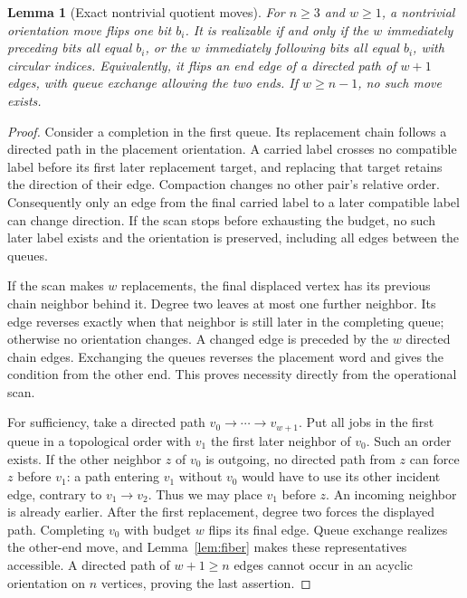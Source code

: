 \documentclass[11pt]{article}
\newtheorem{lemma}[theorem]{Lemma}
\theoremstyle{remark}
\begin{document}
\begin{lemma}[Exact nontrivial quotient moves]\label{lem:local}
For $n\ge3$ and $w\ge1$, a nontrivial orientation move flips one bit $b_i$. It is realizable if and only if the $w$ immediately preceding bits all equal $b_i$, or the $w$ immediately following bits all equal $b_i$, with circular indices. Equivalently, it flips an end edge of a directed path of $w+1$ edges, with queue exchange allowing the two ends. If $w\ge n-1$, no such move exists.
\end{lemma}
\begin{proof}
Consider a completion in the first queue. Its replacement chain follows a directed path in the placement orientation. A carried label crosses no compatible label before its first later replacement target, and replacing that target retains the direction of their edge. Compaction changes no other pair's relative order. Consequently only an edge from the final carried label to a later compatible label can change direction. If the scan stops before exhausting the budget, no such later label exists and the orientation is preserved, including all edges between the queues.

If the scan makes $w$ replacements, the final displaced vertex has its previous chain neighbor behind it. Degree two leaves at most one further neighbor. Its edge reverses exactly when that neighbor is still later in the completing queue; otherwise no orientation changes. A changed edge is preceded by the $w$ directed chain edges. Exchanging the queues reverses the placement word and gives the condition from the other end. This proves necessity directly from the operational scan.

For sufficiency, take a directed path $v_0\to\cdots\to v_{w+1}$. Put all jobs in the first queue in a topological order with $v_1$ the first later neighbor of $v_0$. Such an order exists. If the other neighbor $z$ of $v_0$ is outgoing, no directed path from $z$ can force $z$ before $v_1$: a path entering $v_1$ without $v_0$ would have to use its other incident edge, contrary to $v_1\to v_2$. Thus we may place $v_1$ before $z$. An incoming neighbor is already earlier. After the first replacement, degree two forces the displayed path. Completing $v_0$ with budget $w$ flips its final edge. Queue exchange realizes the other-end move, and Lemma~\ref{lem:fiber} makes these representatives accessible. A directed path of $w+1\ge n$ edges cannot occur in an acyclic orientation on $n$ vertices, proving the last assertion.
\end{proof}
\end{document}
